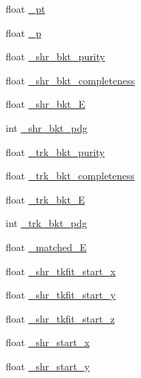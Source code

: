 \begin{DoxyCompactItemize}
float \hyperlink{classselection_1_1CC0piNpSelection_a98281b58b33ff8c03fa9b00f3f3baa06}{\-\_\-pt}
\item 
float \hyperlink{classselection_1_1CC0piNpSelection_afae64b232d6b3526032b289c91b092cb}{\-\_\-p}
\item 
float \hyperlink{classselection_1_1CC0piNpSelection_a1da68886d5b7a5b4eb1785649c48e8ef}{\-\_\-shr\-\_\-bkt\-\_\-purity}
\item 
float \hyperlink{classselection_1_1CC0piNpSelection_ac3c3c9895ca501c3b73f14addfddf495}{\-\_\-shr\-\_\-bkt\-\_\-completeness}
\item 
float \hyperlink{classselection_1_1CC0piNpSelection_aa1a21f48d99a4de5f1d444aa3d64dedf}{\-\_\-shr\-\_\-bkt\-\_\-\-E}
\item 
int \hyperlink{classselection_1_1CC0piNpSelection_aab09f93d7cd57031de714956414f3230}{\-\_\-shr\-\_\-bkt\-\_\-pdg}
\item 
float \hyperlink{classselection_1_1CC0piNpSelection_a39a84b873306f200a2350b4804429791}{\-\_\-trk\-\_\-bkt\-\_\-purity}
\item 
float \hyperlink{classselection_1_1CC0piNpSelection_aab22ce289e2d4a109440369e30fddf52}{\-\_\-trk\-\_\-bkt\-\_\-completeness}
\item 
float \hyperlink{classselection_1_1CC0piNpSelection_aa7a6076f1169185e0b2b02fbb03aba22}{\-\_\-trk\-\_\-bkt\-\_\-\-E}
\item 
int \hyperlink{classselection_1_1CC0piNpSelection_a7044de37ee4f3615ffe4bb15e9f00f8e}{\-\_\-trk\-\_\-bkt\-\_\-pdg}
\item 
float \hyperlink{classselection_1_1CC0piNpSelection_ac75aa3ac33061bbdd378594ee7e6e2e5}{\-\_\-matched\-\_\-\-E}
\item 
float \hyperlink{classselection_1_1CC0piNpSelection_a44002e3cc4d16dce6e6f61ee3a2bae6a}{\-\_\-shr\-\_\-tkfit\-\_\-start\-\_\-x}
\item 
float \hyperlink{classselection_1_1CC0piNpSelection_acd1826c44855b71bce92253f7ac1a758}{\-\_\-shr\-\_\-tkfit\-\_\-start\-\_\-y}
\item 
float \hyperlink{classselection_1_1CC0piNpSelection_a4d3591a8bb7abd9e320f35ca3bf311c2}{\-\_\-shr\-\_\-tkfit\-\_\-start\-\_\-z}
\item 
float \hyperlink{classselection_1_1CC0piNpSelection_ac0fb4dbd656f2f3fb2c12ffc02a0df7c}{\-\_\-shr\-\_\-start\-\_\-x}
\item 
float \hyperlink{classselection_1_1CC0piNpSelection_ade6717f479b053a2c2c9082e597d599f}{\-\_\-shr\-\_\-start\-\_\-y}
\item 

\end{DoxyCompactItemize}
